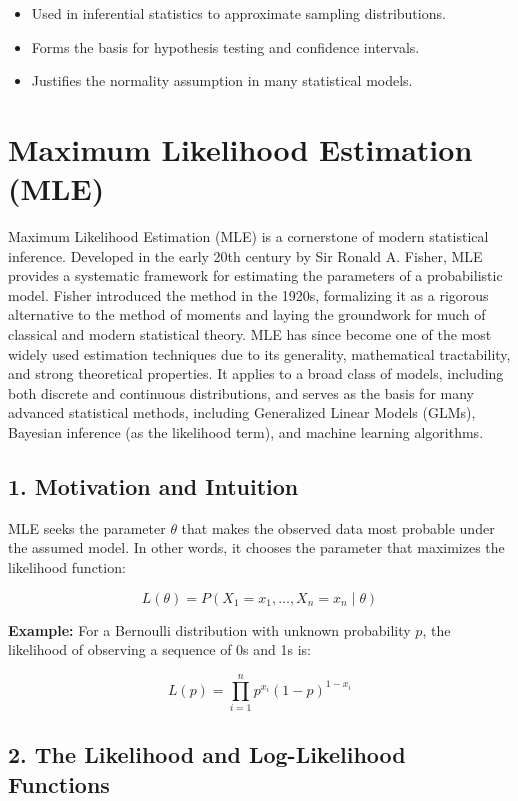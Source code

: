\documentclass{book}
\begin{document}
\begin{itemize}
    \item Used in inferential statistics to approximate sampling distributions.
    \item Forms the basis for hypothesis testing and confidence intervals.
    \item Justifies the normality assumption in many statistical models.
\end{itemize}

\newpage

\section{Maximum Likelihood Estimation (MLE)}

Maximum Likelihood Estimation (MLE) is a cornerstone of modern statistical inference. Developed in the early 20th century by Sir Ronald A. Fisher, MLE provides a systematic framework for estimating the parameters of a probabilistic model. Fisher introduced the method in the 1920s, formalizing it as a rigorous alternative to the method of moments and laying the groundwork for much of classical and modern statistical theory.
MLE has since become one of the most widely used estimation techniques due to its generality, mathematical tractability, and strong theoretical properties. It applies to a broad class of models, including both discrete and continuous distributions, and serves as the basis for many advanced statistical methods, including Generalized Linear Models (GLMs), Bayesian inference (as the likelihood term), and machine learning algorithms.

\subsection{1. Motivation and Intuition}
MLE seeks the parameter $\theta$ that makes the observed data most probable under the assumed model. In other words, it chooses the parameter that maximizes the likelihood function:

\[
L(\theta) = P(X_1 = x_1, \dots, X_n = x_n \mid \theta)
\]

\textbf{Example:} For a Bernoulli distribution with unknown probability $p$, the likelihood of observing a sequence of 0s and 1s is:

\[
L(p) = \prod_{i=1}^{n} p^{x_i}(1-p)^{1 - x_i}
\]

\subsection{2. The Likelihood and Log-Likelihood Functions}
\end{document}
